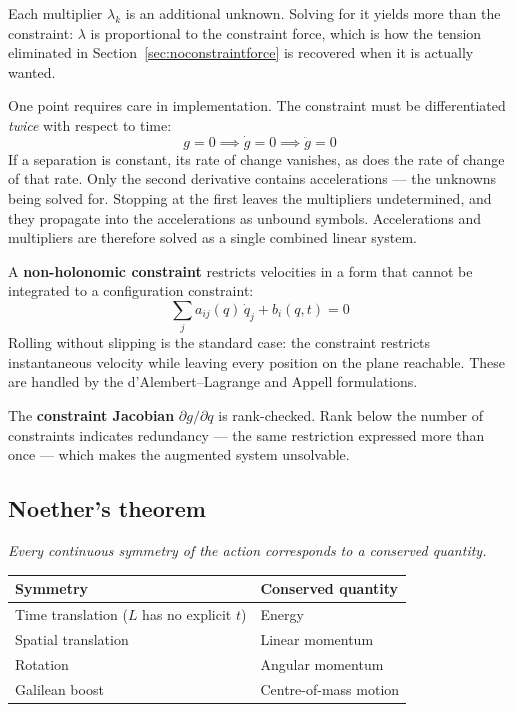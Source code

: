 \documentclass[11pt,a4paper]{article}
\begin{document}
Each multiplier $\lambda_k$ is an additional unknown. Solving for it yields more than the constraint:
$\lambda$ is proportional to the constraint force, which is how the tension eliminated in
Section~\ref{sec:noconstraintforce} is recovered when it is actually wanted.

One point requires care in implementation. The constraint must be differentiated \emph{twice} with
respect to time:
\begin{equation}
g = 0 \implies \dot g = 0 \implies \ddot g = 0
\end{equation}
If a separation is constant, its rate of change vanishes, as does the rate of change of that rate.
Only the second derivative contains accelerations --- the unknowns being solved for. Stopping at the
first leaves the multipliers undetermined, and they propagate into the accelerations as unbound
symbols. Accelerations and multipliers are therefore solved as a single combined linear system.

A \textbf{non-holonomic constraint} restricts velocities in a form that cannot be integrated to a
configuration constraint:
\begin{equation}
\sum_j a_{ij}(q)\,\dot q_j + b_i(q,t) = 0
\end{equation}
Rolling without slipping is the standard case: the constraint restricts instantaneous velocity while
leaving every position on the plane reachable. These are handled by the d'Alembert--Lagrange and
Appell formulations.

The \textbf{constraint Jacobian} $\partial g/\partial q$ is rank-checked. Rank below the number of
constraints indicates redundancy --- the same restriction expressed more than once --- which makes
the augmented system unsolvable.

\subsection{Noether's theorem}
\label{sec:noether}

\emph{Every continuous symmetry of the action corresponds to a conserved quantity.}

\begin{center}
\begin{tabular}{@{}L{7.2cm}L{5.4cm}@{}}
\toprule
\textbf{Symmetry} & \textbf{Conserved quantity} \\
\midrule
Time translation ($L$ has no explicit $t$) & Energy \\
Spatial translation                        & Linear momentum \\
Rotation                                   & Angular momentum \\
Galilean boost                             & Centre-of-mass motion \\
\bottomrule
\end{tabular}
\end{center}
\end{document}
